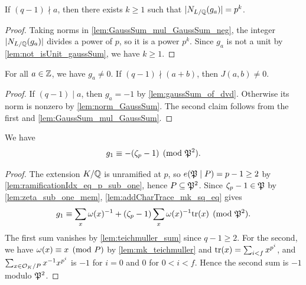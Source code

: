 \begin{lemma}
  \label{lem:norm_GaussSum}
  \leanok
  If $(q-1) \nmid a$, then there exists $k \geq 1$ such that
  $|N_{L/\mathbb{Q}}(g_a)| = p^k$.
\end{lemma}

\begin{proof}
  \leanok
  Taking norms in \ref{lem:GaussSum_mul_GaussSum_neg}, the integer $|N_{L/\mathbb{Q}}(g_a)|$ divides
  a power of $p$, so it is a power $p^k$. Since $g_a$ is not a unit by
  \ref{lem:not_isUnit_gaussSum}, we have $k \geq 1$.
\end{proof}

\begin{lemma}
  \label{lem:gaussSum_ne_zero}
  \leanok
  For all $a \in \mathbb{Z}$, we have $g_a \neq 0$. If $(q-1) \nmid (a+b)$, then $J(a, b) \neq 0$.
\end{lemma}

\begin{proof}
  \leanok
  If $(q-1) \mid a$, then $g_a = -1$ by \ref{lem:gaussSum_of_dvd}. Otherwise its norm is
  nonzero by \ref{lem:norm_GaussSum}. The second claim follows from the first and
  \ref{lem:GaussSum_mul_GaussSum}.
\end{proof}

\begin{lemma}
  \label{lem:mk_sq_gausssum_eq}
  \leanok
  We have
  \[
    g_1 \equiv -(\zeta_p - 1) \pmod{\mathfrak{P}^2}.
  \]
\end{lemma}

\begin{proof}
  \leanok
  The extension $K/\mathbb{Q}$ is unramified at $p$, so $e(\mathfrak{P} \mid P) = p - 1 \geq 2$ by
  \ref{lem:ramificationIdx_eq_p_sub_one}, hence $P \subseteq \mathfrak{P}^2$. Since
  $\zeta_p - 1 \in \mathfrak{P}$ by \ref{lem:zeta_sub_one_mem}, \ref{lem:addCharTrace_mk_sq_eq} gives
  \[
    g_1 \equiv \sum_{x} \omega(x)^{-1} + (\zeta_p-1) \sum_{x} \omega(x)^{-1} \mathrm{tr}(x) \pmod{\mathfrak{P}^2}.
  \]
  The first sum vanishes by \ref{lem:teichmuller_sum} since $q - 1 \geq 2$. For the second, we
  have $\omega(x) \equiv x \pmod{P}$ by \ref{lem:mk_teichmuller} and
  $\mathrm{tr}(x) = \sum_{i<f} x^{p^i}$, and $\sum_{x \in \mathcal{O}_K/P} x^{-1} x^{p^i}$ is $-1$ for $i = 0$
  and $0$ for $0 < i < f$. Hence the second sum is $-1$ modulo $\mathfrak{P}^2$.
\end{proof}

